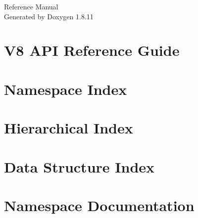 \documentclass[twoside]{book}
\newcommand{\+}{\discretionary{\mbox{\scriptsize$\hookleftarrow$}}{}{}}
\newcommand{\clearemptydoublepage}{%
  \newpage{\pagestyle{empty}\cleardoublepage}%
}
\begin{document}
\hypersetup{pageanchor=false,
             bookmarksnumbered=true,
             pdfencoding=unicode
            }
\begin{titlepage}
\vspace*{7cm}
\begin{center}%
{\Large Reference Manual}\\
\vspace*{1cm}
{\large Generated by Doxygen 1.8.11}\\
\end{center}
\end{titlepage}
\clearemptydoublepage
\tableofcontents
\clearemptydoublepage
{}
\hypersetup{pageanchor=true}

\chapter{V8 A\+PI Reference Guide}
\label{index}\hypertarget{index}{}
\chapter{Namespace Index}

\chapter{Hierarchical Index}

\chapter{Data Structure Index}

\chapter{Namespace Documentation}

\end{document}

